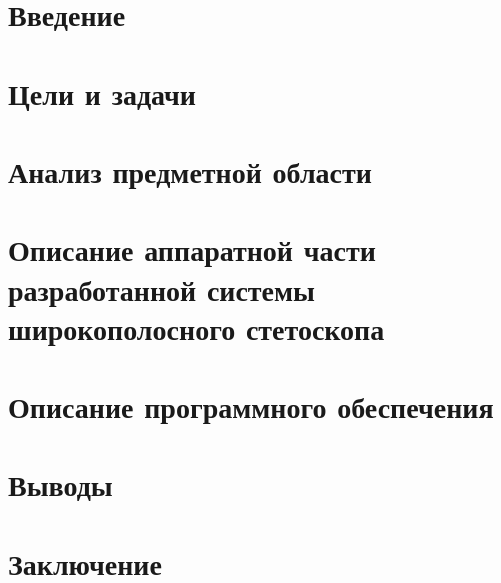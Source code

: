 \documentclass[a4paper, 14pt]{extarticle}
\begin{document}
\begin{titlepage}

\end{titlepage}


\newpage  

\tableofcontents
\newpage 

\section*{Введение}
%

\newpage  

\section{Цели и задачи}

\newpage

\section{Анализ предметной области}

\newpage

\section{Описание аппаратной части разработанной системы широкополосного стетоскопа}


\section{Описание программного обеспечения}

\newpage

\section*{Выводы}
%

\newpage

\section*{Заключение}
%

\newpage

%

\end{document}
